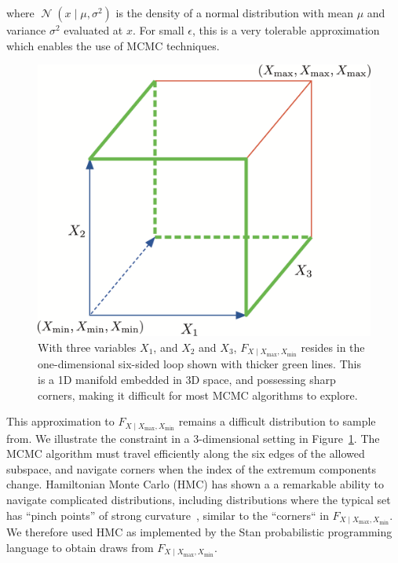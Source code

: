 \documentclass[letter]{article}
\makeatletter
\def\maxwidth{\ifdim\Gin@nat@width>\linewidth\linewidth
\else\Gin@nat@width\fi}
\let\Oldincludegraphics\includegraphics
\renewcommand{\includegraphics}[1]{\Oldincludegraphics[width=0.98\maxwidth]{#1}}
\newcommand{\genericdel}[3]{%
      \left#1#3\right#2
    }
\newcommand{\del}[1]{\genericdel(){#1}}
\DeclareMathOperator{\normal}{\mathcal{N}}
\newcommand{\Xmax}{X_{\max}}
\newcommand{\Xmin}{X_{\min}}
\newcommand{\Fcond}{F_{X \mid \Xmax,\Xmin}}
\renewcommand{\cite}[1]{\citep{#1}}
\makeatother
\begin{document}
where \(\normal\del{x \mid \mu, \sigma^2}\) is the density of a normal distribution with mean \(\mu\) and variance \(\sigma^2\) evaluated at \(x\).
For small \(\epsilon\), this is a very tolerable approximation which enables the use of MCMC techniques.
    


        \begin{figure}
\centering
\includegraphics{../figures/constraints3d.png}
\caption{\label{fig:constraints3d}
With three variables \(X_1\), and \(X_2\) and \(X_3\), \(\Fcond\) resides in the one-dimensional six-sided loop shown with thicker green lines. This is a 1D manifold embedded in 3D space, and possessing sharp corners, making it difficult for most MCMC algorithms to explore.}
\end{figure}

This approximation to \(\Fcond\) remains a difficult distribution to sample from.
We illustrate the constraint in a 3-dimensional setting in Figure~\ref{fig:constraints3d}.
The MCMC algorithm must travel efficiently along the six edges of the allowed subspace,
and navigate corners when the index of the extremum components change.
Hamiltonian Monte Carlo (HMC) has shown a a remarkable ability to navigate complicated distributions, including distributions where the typical set has ``pinch points'' of strong
curvature~\cite{betancourt2017conceptual}, similar to the ``corners`` in \(\Fcond\).
We therefore used HMC as implemented by the Stan probabilistic programming language \cite{stancite} to obtain draws from \(\Fcond\).
    
\end{document}
